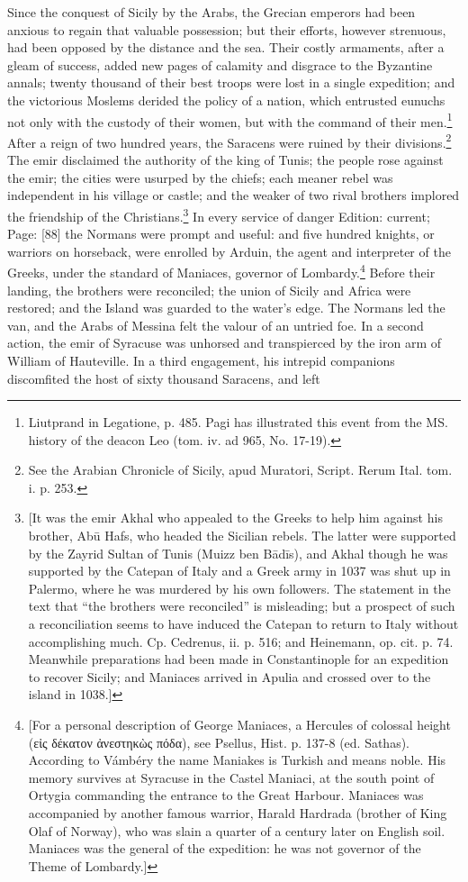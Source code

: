 Since the conquest of Sicily by the Arabs, the Grecian emperors had been anxious to regain that valuable possession; but their efforts, however strenuous, had been opposed by the distance and the sea. Their costly armaments, after a gleam of success, added new pages of calamity and disgrace to the Byzantine annals; twenty thousand of their best troops were lost in a single expedition; and the victorious Moslems derided the policy of a nation, which entrusted eunuchs not only with the custody of their women, but with the command of their men.\footnote{Liutprand in Legatione, p. 485. Pagi has illustrated this event from the MS. history of the deacon Leo (tom. iv. ad 965, No. 17-19).} After a reign of two hundred years, the Saracens were ruined by their divisions.\footnote{See the Arabian Chronicle of Sicily, apud Muratori, Script. Rerum Ital. tom. i. p. 253.} The emir disclaimed the authority of the king of Tunis; the people rose against the emir; the cities were usurped by the chiefs; each meaner rebel was independent in his village or castle; and the weaker of two rival brothers implored the friendship of the Christians.\footnote{[It was the emir Akhal who appealed to the Greeks to help him against his brother, Abū Hafs, who headed the Sicilian rebels. The latter were supported by the Zayrid Sultan of Tunis (Muizz ben Bādīs), and Akhal though he was supported by the Catepan of Italy and a Greek army in 1037 was shut up in Palermo, where he was murdered by his own followers. The statement in the text that \texthebrew{“}the brothers were reconciled\texthebrew{}” is misleading; but a prospect of such a reconciliation seems to have induced the Catepan to return to Italy without accomplishing much. Cp. Cedrenus, ii. p. 516; and Heinemann, op. cit. p. 74. Meanwhile preparations had been made in Constantinople for an expedition to recover Sicily; and Maniaces arrived in Apulia and crossed over to the island in 1038.]} In every service of danger Edition: current; Page: [88] the Normans were prompt and useful: and five hundred knights, or warriors on horseback, were enrolled by Arduin, the agent and interpreter of the Greeks, under the standard of Maniaces, governor of Lombardy.\footnote{[For a personal description of George Maniaces, a Hercules of colossal height (\textgreek{ε\texthebrew{ἰ}ς δέκατον \texthebrew{ἀ}νεστηκ\texthebrew{ὼ}ς πόδα}), see Psellus, Hist. p. 137-8 (ed. Sathas). According to Vámbéry the name Maniakes is Turkish and means noble. His memory survives at Syracuse in the Castel Maniaci, at the south point of Ortygia commanding the entrance to the Great Harbour. Maniaces was accompanied by another famous warrior, Harald Hardrada (brother of King Olaf of Norway), who was slain a quarter of a century later on English soil. Maniaces was the general of the expedition: he was not governor of the Theme of Lombardy.]} Before their landing, the brothers were reconciled; the union of Sicily and Africa were restored; and the Island was guarded to the water\texthebrew{}’s edge. The Normans led the van, and the Arabs of Messina felt the valour of an untried foe. In a second action, the emir of Syracuse was unhorsed and transpierced by the iron arm of William of Hauteville. In a third engagement, his intrepid companions discomfited the host of sixty thousand Saracens, and left 